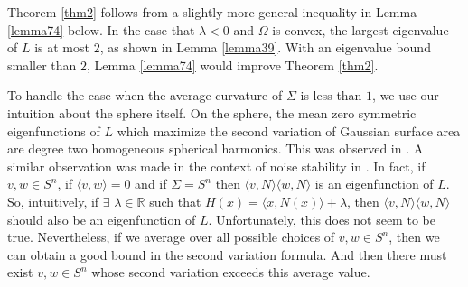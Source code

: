 \documentclass[12pt,reqno]{amsart}
\newtheorem{theorem}{Theorem}[section]
\newtheorem{cor}[theorem]{Corollary}
\theoremstyle{definition}
\newcommand{\vnormt}[1]{\left\|#1\right\|}    %
\newcommand{\R}{\mathbb{R}}
\newcommand{\embolden}[1]{\textbf {#1}}
\newcommand{\sdimn}{n}
\newcommand{\scon}{\lambda}
\newcommand{\pcon}{\delta}
\begin{document}
Theorem \ref{thm2} follows from a slightly more general inequality in Lemma \ref{lemma74} below.  In the case that $\scon<0$ and $\Omega$ is convex, the largest eigenvalue of $L$ is at most $2$, as shown in Lemma \ref{lemma39}.  With an eigenvalue bound smaller than $2$, Lemma \ref{lemma74} would improve Theorem \ref{thm2}.



%
%
%
%

To handle the case when the average curvature of $\Sigma$ is less than $1$, we use our intuition about the sphere itself.  On the sphere, the mean zero symmetric eigenfunctions of $L$ which maximize the second variation of Gaussian surface area are degree two homogeneous spherical harmonics.  This was observed in \cite{lamanna17}.  A similar observation was made in the context of noise stability in \cite{heilman15}.  In fact, if $v,w\in S^{\sdimn}$, if $\langle v,w\rangle=0$ and if $\Sigma= S^{\sdimn}$ then $\langle v,N\rangle\langle w,N\rangle$ is an eigenfunction of $L$.  So, intuitively, if $\exists$ $\scon\in\R$ such that $H(x)=\langle x,N(x)\rangle+\scon$, then $\langle v,N\rangle\langle w,N\rangle$ should also be an eigenfunction of $L$.  Unfortunately, this does not seem to be true.  Nevertheless, if we average over all possible choices of $v,w\in S^{\sdimn}$, then we can obtain a good bound in the second variation formula.  And then there must exist $v,w\in S^{\sdimn}$ whose second variation exceeds this average value.
\end{document}
